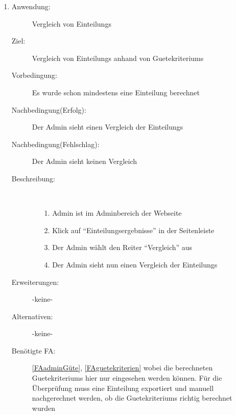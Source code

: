 \documentclass[parskip=full]{scrartcl}
\newcommand{\swtLabel}[1]{\textbf{/#1\arabic*0/}}
\begin{document}
\begin{enumerate} [label=\swtLabel{A}]
  \item \label{UCadminVergleichGuete}
    \begin{description}
  	\item[Anwendung:] Vergleich von \glspl{Einteilung}
  	\item[Ziel:] Vergleich von \glspl{Einteilung} anhand von \glspl{Guetekriterium}
  	\item[Vorbedingung:] Es wurde schon mindestens eine \gls{Einteilung} berechnet
  	\item[Nachbedingung(Erfolg):] Der \gls{Admin} sieht einen Vergleich der
  	\glspl{Einteilung}
  	\item[Nachbedingung(Fehlschlag):] Der \gls{Admin} sieht keinen Vergleich
  	\item[Beschreibung:]~
  	\begin{enumerate}
  	  \item[1.] \gls{Admin} ist im \gls{Admin}bereich der Webseite
      \item[2.] Klick auf \enquote{\gls{Einteilung}sergebnisse} in der Seitenleiste
      \item[3.] Der \gls{Admin} wählt den Reiter \enquote{Vergleich} aus
      \item[4.] Der \gls{Admin} sieht nun einen Vergleich der \glspl{Einteilung}
  	\end{enumerate}
  	\item[Erweiterungen:] -keine-
  	\item[Alternativen:] -keine-
  	\item[Benötigte FA:] \ref{FAadminGüte}, \ref{FAguetekriterien} wobei die
  	berechneten \glspl{Guetekriterium} hier nur eingesehen werden können. Für die
  	Überprüfung muss eine \gls{Einteilung} exportiert und manuell nachgerechnet werden,
  	ob die \glspl{Guetekriterium} richtig berechnet wurden
  \end{description}
  

\end{enumerate}
\end{document}
